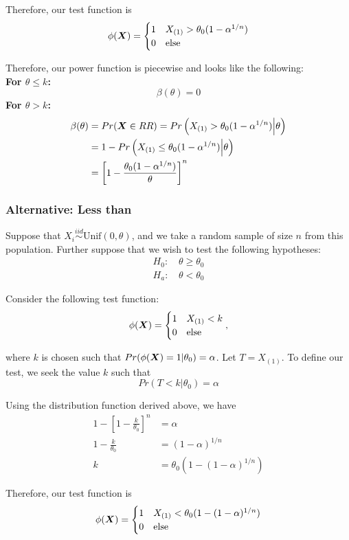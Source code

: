 \documentclass[]{article}
\newcommand{\bfX}{\mbox{\boldmath $X$}}
\begin{document}
Therefore, our test function is
\[
\phi(\bfX) = \begin{cases}
1 & X_{(1)} > \theta_0(1-\alpha^{1/n}) \\
0 & \text{else}
\end{cases}
\]

Therefore, our power function is piecewise and looks like the following:\\
\textbf{For $\theta \leq k$:}
\[
\beta(\theta) = 0
\]
\textbf{For $\theta > k$:}
\[
\begin{split}
\beta(\theta) &= Pr(\bfX \in RR) = Pr\left(X_{(1)} > \theta_0(1-\alpha^{1/n}) \Big| \theta\right) \\
&= 1 - Pr\left(X_{(1)}\leq \theta_0(1-\alpha^{1/n}) \Big| \theta\right) \\
&= \left[1 - \frac{\theta_0(1-\alpha^{1/n})}{\theta}\right]^n
\end{split}
\]

\subsubsection{Alternative: Less than}

Suppose that $X_i \stackrel{iid}{\sim} \text{Unif}(0, \theta)$, and we take a random sample of size $n$ from this population. Further suppose that we wish to test the following hypotheses:
\[
\begin{split}
\text{$H_0$: }& \theta \geq \theta_0 \\
\text{$H_a$: }& \theta < \theta_0
\end{split}
\]

Consider the following test function:
\[
\phi(\bfX) = \begin{cases}
1 & X_{(1)} < k \\
0 & \text{else}
\end{cases},
\]

where $k$ is chosen such that $Pr(\phi(\bfX) = 1|\theta_0) = \alpha$. Let $T = X_{(1)}$. To define our test, we seek the value $k$ such that 
\[
Pr(T < k | \theta_0) = \alpha
\]

Using the distribution function derived above, we have
\[
\begin{split}
1 - \left[1 - \frac{k}{\theta_0}\right]^n &= \alpha \\
1 - \frac{k}{\theta_0} &= (1 - \alpha)^{1/n} \\
k &= \theta_0(1 - (1 - \alpha)^{1/n})
\end{split}
\]

Therefore, our test function is
\[
\phi(\bfX) = \begin{cases}
1 & X_{(1)} < \theta_0(1 - (1 - \alpha)^{1/n}) \\
0 & \text{else}
\end{cases}
\]
\end{document}
